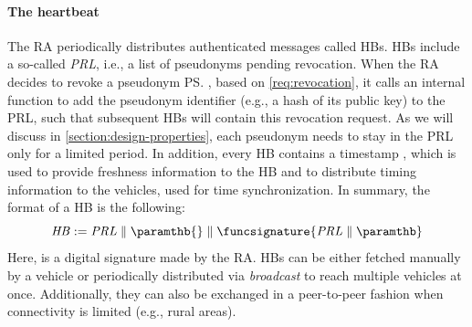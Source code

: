 \paragraph{The heartbeat}
%
The \ac{RA} periodically distributes authenticated messages called \acfp{HB}.
\acp{HB} include a so-called \emph{\ac{PRL}}, i.e., a list of pseudonyms pending
revocation. When the \ac{RA} decides to revoke a pseudonym \ps, based on
\cref{req:revocation}, it calls an internal \funcrevokedaa{} function to add the
pseudonym identifier (e.g., a hash of its public key) to the \ac{PRL}, such that
subsequent \acp{HB} will contain this revocation request. As we will discuss in
\cref{section:design-properties}, each pseudonym needs to stay in the \ac{PRL}
only for a limited period. In addition, every \ac{HB} contains a timestamp
\paramthb, which is used to provide freshness information to the \ac{HB} and to
distribute timing information to the vehicles, used for time synchronization. In
summary, the format of a \ac{HB} is the following:
%
\begin{equation}
    \label{eq:heartbeat-format}
    \mathit{HB} := \mathit{PRL} \parallel \paramthb{} \parallel \funcsignature{\mathit{PRL} \parallel \paramthb}
\end{equation} 
%
Here, \funcsignature{} is a digital signature made by the \ac{RA}. \acp{HB} can
be either fetched manually by a vehicle or periodically distributed via
\emph{broadcast} to reach multiple vehicles at once. Additionally, they can also
be exchanged in a peer-to-peer fashion when connectivity is limited (e.g., rural
areas).

